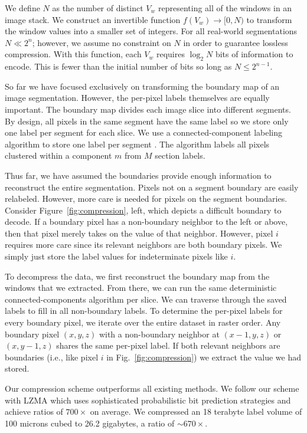 We define $N$ as the number of distinct $V_w$ representing all of the windows in an image stack. 
We construct an invertible function $f(V_w) \to [0, N)$ to transform the window values into a smaller set of integers. 
For all real-world segmentations $N \ll 2^n$; however, we assume no constraint on $N$ in order to guarantee lossless compression. 
With this function, each $V_w$ requires $\log_2{N}$ bits of information to encode. 
This is fewer than the initial number of bits so long as $N \leq 2^{n - 1}$.  

So far we have focused exclusively on transforming the boundary map of an image segmentation. 
However, the per-pixel labels themselves are equally important. 
The boundary map divides each image slice into different segments. 
By design, all pixels in the same segment have the same label so we store only one label per segment for each slice. 
We use a connected-component labeling algorithm to store one label per segment \cite{he2009fast}. 
The algorithm labels all pixels clustered within a component $m$ from $M$ section labels.

Thus far, we have assumed the boundaries provide enough information to reconstruct the entire segmentation.
Pixels not on a segment boundary are easily relabeled.
However, more care is needed for pixels on the segment boundaries. 
Consider Figure~\ref{fig:compression}, left, which depicts a difficult boundary to decode. 
If a boundary pixel has a non-boundary neighbor to the left or above, then that pixel merely takes on the value of that neighbor. 
However, pixel $i$ requires more care since its relevant neighbors are both boundary pixels. 
We simply just store the label values for indeterminate pixels like $i$.

To decompress the data, we first reconstruct the boundary map from the windows that we extracted.
From there, we can run the same deterministic connected-components algorithm per slice.
We can traverse through the saved labels to fill in all non-boundary labels.
To determine the per-pixel labels for every boundary pixel, we iterate over the entire dataset in raster order. 
Any boundary pixel $(x, y, z)$ with a non-boundary neighbor at $(x - 1, y, z)$ or $(x, y - 1, z)$ shares the same per-pixel label. 
If both relevant neighbors are boundaries (i.e., like pixel $i$ in Fig.~\ref{fig:compression}) we extract the value we had stored.

Our compression scheme outperforms all existing methods.
We follow our scheme with LZMA which uses sophisticated probabilistic bit prediction strategies and achieve ratios of $700\times$ on average.
We compressed an 18 terabyte label volume of 100 microns cubed to 26.2 gigabytes, a ratio of $\sim670\times$. 
